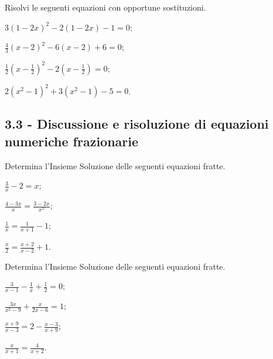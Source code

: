 \begin{esercizio}[\Ast]
\label{ese:3.35}
Risolvi le seguenti equazioni con opportune sostituzioni.
\begin{multicols}{2}
\begin{enumeratea}
\item $3 (1-2x)^{2}-2 (1-2x)-1 = 0$;
\item $\frac{4}{3} (x-2)^{2}-6 (x-2) + 6 = 0$;
\item $\frac{1}{2} \left(x-\frac{1}{2} \right)^{2}-2 \left(x -\frac{1}{2} \right) = 0$;
\item $2 (x^{2}-1)^{2} + 3 (x^{2}-1)-5 = 0$.
\end{enumeratea}
\end{multicols}
\end{esercizio}

\subsection*{3.3 - Discussione e risoluzione di equazioni numeriche frazionarie}

\begin{esercizio}[\Ast]
\label{ese:3.36}
Determina l'Insieme Soluzione delle seguenti equazioni fratte.
\begin{multicols}{2}
\begin{enumeratea}
\item $\frac{3}{x}-2 = x$;
\item $\frac{4-3 x}{x}=\frac{3-2 x}{x^{2}}$;
\item $\frac{1}{x} = \frac{1}{x + 1}-1$;
\item $\frac{x}{2} = \frac{x + 2}{x-2} + 1$.
\end{enumeratea}
\end{multicols}
\end{esercizio}

\begin{esercizio}[\Ast]
\label{ese:3.37}
Determina l'Insieme Soluzione delle seguenti equazioni fratte.
\begin{multicols}{2}
\begin{enumeratea}
\item $\frac{3}{x-1}-\frac{1}{x} + \frac{1}{2} = 0$;
\item $\frac{3 x}{x^{2}-9} + \frac{x}{2 x-6}=1$;
\item $\frac{x + 9}{x-3}=2-\frac{x-3}{x + 9}$;
\item $\frac{x}{x + 1} = \frac{4}{x + 2}$.
\end{enumeratea}
\end{multicols}
\end{esercizio}

